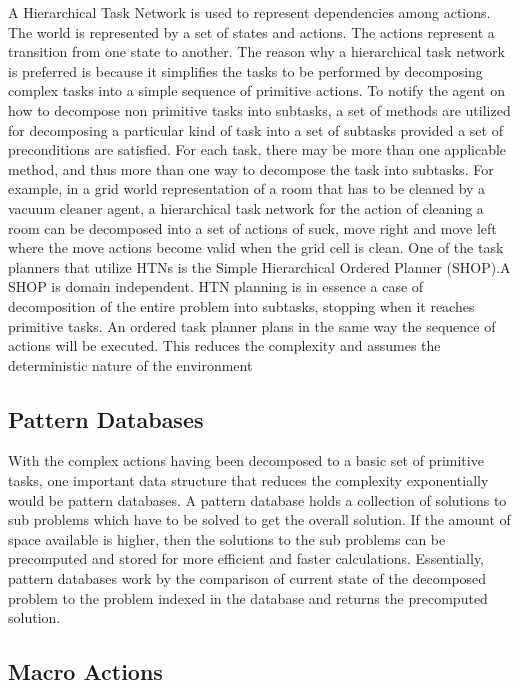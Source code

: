 \documentclass[tog]{acmsiggraph}
\begin{document}
A Hierarchical Task Network is used to represent dependencies among
actions. The world is represented by a set of states and actions. The
actions represent a transition from one state to another. The reason
why a hierarchical task network is preferred is because it simplifies
the tasks to be performed by decomposing complex tasks into a simple
sequence of primitive actions. To notify the agent on how to decompose
non primitive tasks into subtasks, a set of methods are utilized for
decomposing a particular kind of task into a set of subtasks provided
a set of preconditions are satisfied. For each task, there may be more
than one applicable method, and thus more than one way to decompose
the task into subtasks. For example, in a grid
world representation of a room that has to be cleaned by a vacuum
cleaner agent, a hierarchical task network for the action of cleaning
a room can be decomposed into a set of actions of suck, move right and
move left where the move actions become valid when the grid cell is
clean. One of the task planners that utilize HTNs is the Simple
Hierarchical Ordered Planner (SHOP).A SHOP is domain independent. HTN
planning is in essence a case of decomposition of the entire problem
into subtasks, stopping when it reaches primitive tasks. An ordered
task planner plans in the same way the sequence of actions will be
executed. This reduces the complexity and assumes the deterministic
nature of the environment

\subsection{Pattern Databases}

With the complex actions having been decomposed to a basic set of
primitive tasks, one important data structure that reduces the
complexity exponentially would be pattern databases. A pattern
database holds a collection of solutions to sub problems which have to
be solved to get the overall solution. If the amount of space
available is higher, then the solutions to the sub problems can be
precomputed and stored for more efficient and faster calculations.
Essentially, pattern databases work by the comparison of current state
of the decomposed problem to the problem indexed in the database and
returns the precomputed solution.

\subsection{Macro Actions}
\end{document}
